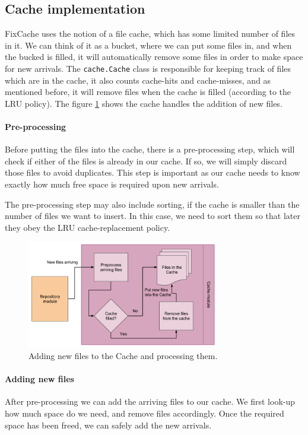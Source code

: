\documentclass[12pt,twoside,notitlepage]{report}
\newcommand{\fxch}{FixCache}
\begin{document}
\subsection{Cache implementation}
\fxch{} uses the notion of a file cache, which has some limited number of files in it. We can think of it as a bucket, where we can put some files in, and when the bucked is filled, it will automatically remove some files in order to make space for new arrivals. The \texttt{cache.Cache} class is responsible for keeping track of files which are in the cache, it also counts cache-hits  and cache-misses, and as mentioned before, it will remove files when the cache is filled (according to the LRU policy). The figure \ref{cache_module} shows the cache handles the addition of new files.

\paragraph{Pre-processing}
Before putting the files into the cache, there is a pre-processing step, which will check if either of the files is already in our cache. If so, we will simply discard those files to avoid duplicates. This step is important as our cache needs to know exactly how much free space is required upon new arrivals.

The pre-processing step may also include sorting, if the cache is smaller than the number of files we want to insert. In this case, we need to sort them so that later they obey the LRU cache-replacement policy.
\begin{figure}[h]
\centering
    \includegraphics[width=0.75\textwidth]{cache_module.png}
  \caption{Adding new files to the Cache and processing them.}
  \label{cache_module}
\end{figure}

\paragraph{Adding new files} After pre-processing we can add the arriving files to our cache. We first look-up how much space do we need, and remove files accordingly. Once the required space has been freed, we can safely add the new arrivals.
\end{document}
